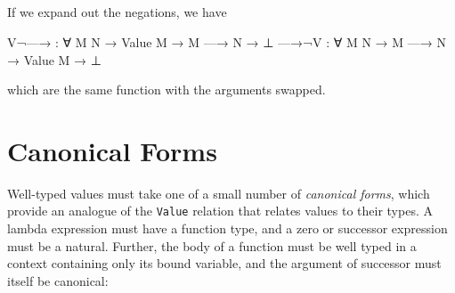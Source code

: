\begin{fence}
\begin{code}%
\>[0]\AgdaSpace{}%
\AgdaSymbol{:}\AgdaSpace{}%
\AgdaSpace{}%
\AgdaSymbol{\{}\AgdaSpace{}%
\AgdaSymbol{\}}\<%
\\
\>[0][@{}l@{\AgdaIndent{0}}]%
\>[2]%
\>[81I]\AgdaSpace{}%
\AgdaSpace{}%
\<%
\\
\>[.][@{}l@{}]\<[81I]%
\>[4]\AgdaComment{---------}\<%
\\
%
\>[2]\AgdaSpace{}%
\AgdaSpace{}%
\AgdaSpace{}%
\<%
\\
\>[0]\AgdaSpace{}%
\AgdaSpace{}%
%
\>[14]\AgdaSymbol{=}%
\>[17]\AgdaSpace{}%
\AgdaSpace{}%
\<%
\end{code}
\end{fence}

If we expand out the negations, we have

\begin{myDisplay}
V¬—→ : ∀ {M N} → Value M → M —→ N → ⊥
—→¬V : ∀ {M N} → M —→ N → Value M → ⊥
\end{myDisplay}

which are the same function with the arguments swapped.

\hypertarget{canonical-forms}{%
\section{Canonical Forms}\label{canonical-forms}}

Well-typed values must take one of a small number of \emph{canonical
forms}, which provide an analogue of the \texttt{Value} relation that
relates values to their types. A lambda expression must have a function
type, and a zero or successor expression must be a natural. Further, the
body of a function must be well typed in a context containing only its
bound variable, and the argument of successor must itself be canonical:

